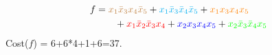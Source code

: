 \documentclass[twocolumn]{article}
\newcommand{\bx}{\bar{x}}
\begin{document}
% 
\begin{align}
  f &= {\color{brown} x_1 \bx_3 x_4\bx_5} + {\color{cyan} x_1 \bx_3 \bx_4 \bx_5}
      + {\color{orange} x_1 x_3 x_4 x_5 }
  \notag\\&\qquad
      + {\color{red} x_1 \bx_2\bx_3x_4}
      + {\color{blue} x_2x_3 x_4x_5}
      + {\color{green} x_2\bx_3 \bx_4 x_5}
\end{align}
% 
Cost($f$) = 6+6*4+1+6=37.

%
%
\end{document}
